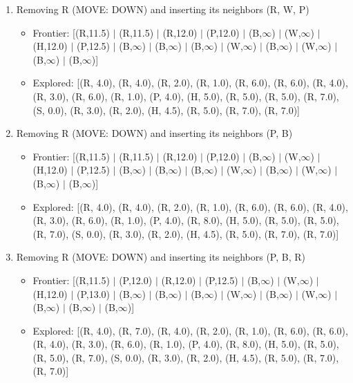 \documentclass[12pt]{article}
\begin{document}
\begin{enumerate}
\item Removing R (MOVE: DOWN) and inserting its neighbors (R, W, P)
\begin{itemize}
\item Frontier: [(R,11.5) \(|\) (R,11.5) \(|\) (R,12.0) \(|\) (P,12.0) \(|\) (B,\(\infty\)) \(|\) (W,\(\infty\)) \(|\) (H,12.0) \(|\) (P,12.5) \(|\) (B,\(\infty\)) \(|\) (B,\(\infty\)) \(|\) (B,\(\infty\)) \(|\) (W,\(\infty\)) \(|\) (B,\(\infty\)) \(|\) (W,\(\infty\)) \(|\) (B,\(\infty\)) \(|\) (B,\(\infty\))]
\item Explored: [(R, 4.0), (R, 4.0), (R, 2.0), (R, 1.0), (R, 6.0), (R, 6.0), (R, 4.0), (R, 3.0), (R, 6.0), (R, 1.0), (P, 4.0), (H, 5.0), (R, 5.0), (R, 5.0), (R, 7.0), (S, 0.0), (R, 3.0), (R, 2.0), (H, 4.5), (R, 5.0), (R, 7.0), (R, 7.0)]
\end{itemize}

\item Removing R (MOVE: DOWN) and inserting its neighbors (P, B)
\begin{itemize}
\item Frontier: [(R,11.5) \(|\) (R,11.5) \(|\) (R,12.0) \(|\) (P,12.0) \(|\) (B,\(\infty\)) \(|\) (W,\(\infty\)) \(|\) (H,12.0) \(|\) (P,12.5) \(|\) (B,\(\infty\)) \(|\) (B,\(\infty\)) \(|\) (B,\(\infty\)) \(|\) (W,\(\infty\)) \(|\) (B,\(\infty\)) \(|\) (W,\(\infty\)) \(|\) (B,\(\infty\)) \(|\) (B,\(\infty\))]
\item Explored: [(R, 4.0), (R, 4.0), (R, 2.0), (R, 1.0), (R, 6.0), (R, 6.0), (R, 4.0), (R, 3.0), (R, 6.0), (R, 1.0), (P, 4.0), (R, 8.0), (H, 5.0), (R, 5.0), (R, 5.0), (R, 7.0), (S, 0.0), (R, 3.0), (R, 2.0), (H, 4.5), (R, 5.0), (R, 7.0), (R, 7.0)]
\end{itemize}

\item Removing R (MOVE: DOWN) and inserting its neighbors (P, B, R)
\begin{itemize}
\item Frontier: [(R,11.5) \(|\) (P,12.0) \(|\) (R,12.0) \(|\) (P,12.5) \(|\) (B,\(\infty\)) \(|\) (W,\(\infty\)) \(|\) (H,12.0) \(|\) (P,13.0) \(|\) (B,\(\infty\)) \(|\) (B,\(\infty\)) \(|\) (B,\(\infty\)) \(|\) (W,\(\infty\)) \(|\) (B,\(\infty\)) \(|\) (W,\(\infty\)) \(|\) (B,\(\infty\)) \(|\) (B,\(\infty\)) \(|\) (B,\(\infty\))]
\item Explored: [(R, 4.0), (R, 7.0), (R, 4.0), (R, 2.0), (R, 1.0), (R, 6.0), (R, 6.0), (R, 4.0), (R, 3.0), (R, 6.0), (R, 1.0), (P, 4.0), (R, 8.0), (H, 5.0), (R, 5.0), (R, 5.0), (R, 7.0), (S, 0.0), (R, 3.0), (R, 2.0), (H, 4.5), (R, 5.0), (R, 7.0), (R, 7.0)]
\end{itemize}


\end{enumerate}
\end{document}
